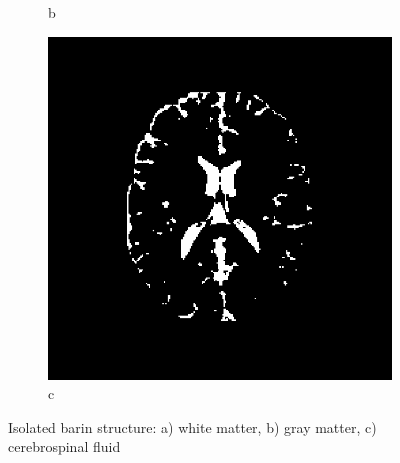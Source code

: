 \begin{figure}[H]
\begin{subfigure}[b]{0.25\linewidth}
		\caption{b}
	\end{subfigure}
	\begin{subfigure}[b]{0.25\linewidth}
		\includegraphics[width=\linewidth]{figures/Module_09/m09_9}
		\caption{c}
	\end{subfigure}
	\caption{Isolated barin structure: a) white matter, b) gray matter, c) cerebrospinal fluid} 
	\label{fig:figures/m09_8910}
\end{figure} 

